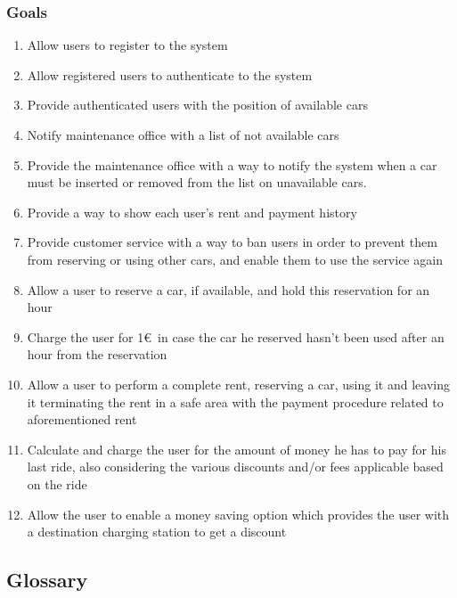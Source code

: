 	\subsubsection{Goals}
	\begin{enumerate}[label=\textbf{G\arabic*}]
		\item \label{goal:register} Allow users to register to the system
		\item \label{goal:login}Allow registered users to authenticate to the system
		\item \label{goal:position}Provide authenticated users with the position of available cars
		\item \label{goal:notifyMaintenance} Notify maintenance office with a list of not available cars 
		\item \label{goal:maintenance} Provide the maintenance office with a way to notify the system when a car must be inserted or removed from the list on unavailable cars.
		\item \label{goal:usersHistory} Provide a way to show each user's rent and payment history
		\item \label{goal:banUnbanUsers}Provide customer service with a way to ban users in order to prevent them from reserving or using other cars, and enable them to use the service again
		\item \label{goal:carReservation} Allow a user to reserve a car, if available, and hold this reservation for an hour
		\item \label{goal:reservationFee}Charge the user for 1\euro\ in case the car he reserved hasn't been used after an hour from the reservation
		\item \label{goal:completeRent}Allow a user to perform a complete rent, reserving a car, using it and leaving it terminating the rent in a safe area with the payment procedure related to aforementioned rent
		\item \label{goal:calculateCost}Calculate and charge the user for the amount of money he has to pay for his last ride, also considering the various discounts and/or fees applicable based on the ride
		\item \label{goal:moneySavingOption}Allow the user to enable a money saving option which provides the user with a destination charging station to get a discount
	\end{enumerate}

\subsection{Glossary}
